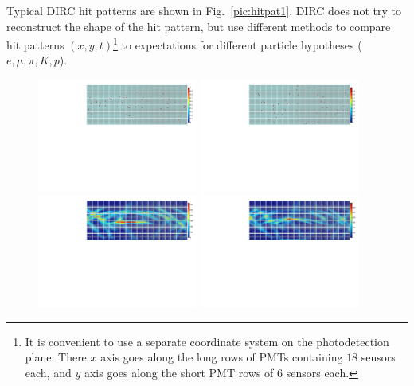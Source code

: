 Typical \gluex DIRC hit patterns are shown in Fig.~\ref{pic:hitpat1}. DIRC does not try to reconstruct the shape of the hit pattern, but use different methods to compare hit patterns $(x,y,t)$\footnote{It is convenient to use a separate coordinate system on the photodetection plane. There $x$ axis goes along the long rows of PMTs containing $18$ sensors each, and $y$ axis goes along the short PMT rows of $6$ sensors each.} to expectations for different particle hypotheses ($e, \mu, \pi, K, p$).

\begin{figure}[!h]
\centering
\includegraphics[angle=0,width=0.47\textwidth]{pics/single_ka_th8_phi158_p2.pdf} \hspace{0.5cm} \includegraphics[angle=0,width=0.47\textwidth]{pics/single_pi_th8_phi158_p2.pdf}\\
\includegraphics[angle=0,width=0.47\textwidth]{pics/ka_th8_phi158_p2.pdf} \hspace{0.5cm} \includegraphics[angle=0,width=0.47\textwidth]{pics/pi_th8_phi158_p2.pdf}

\end{figure}

